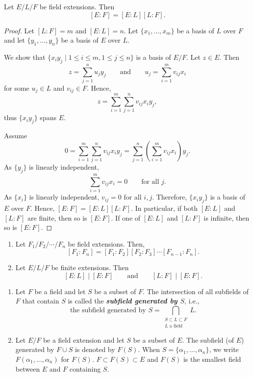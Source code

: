 \documentclass[twoside]{article}
\theoremstyle{remark}
\newcommand*\term[1]{\textbf{\textit{\mathversion{bold}#1}}}
\begin{document}
\begin{proposition}
  Let \(E/L/F\) be field extensions. Then
  \[ [E:F] = [E:L][L:F]. \]
\end{proposition}

\begin{proof}
  Let \([L:F] = m\) and \([E:L] = n\). Let \(\{x_1, \dots, x_m\}\) be a basis of \(L\) over \(F\) and let \(\{y_1, \dots, y_n\}\) be a basis of \(E\) over \(L\).
  
  We show that \(\{x_i y_j \mid 1 \leq i \leq m, 1 \leq j \leq n\}\) is a basis of \(E/F\). Let \(z \in E\). Then
  \[ z = \sum_{j=1}^n u_j y_j \qquad \text{and} \qquad u_j = \sum_{i=1}^m v_{ij} x_i \]
  for some \(u_j \in L\) and \(v_{ij} \in F\). Hence,
  \[ z = \sum_{i=1}^m \sum_{j=1}^n v_{ij} x_i y_j, \]
  thus \(\{x_i y_j\}\) spans \(E\).
  
  Assume
  \[ 0 = \sum_{i=1}^m \sum_{j=1}^n v_{ij} x_i y_j = \sum_{j=1}^n \left( \sum_{i=1}^m v_{ij} x_i \right) y_j. \]
  As \(\{y_j\}\) is linearly independent,
  \[ \sum_{i=1}^m v_{ij} x_i = 0 \qquad \text{for all } j. \]
  As \(\{x_i\}\) is linearly independent, \(v_{ij} = 0\) for all \(i,j\). Therefore, \(\{x_iy_j\}\) is a basis of \(E\) over \(F\). Hence, \([E:F] = [E:L] [L:F]\). In particular, if both \([E:L]\) and \([L:F]\) are finite, then so is \([E:F]\). If one of \([E:L]\) and \([L:F]\) is infinite, then so is \([E:F]\).
\end{proof}

\begin{corollary}
  \begin{enumerate}[label=\textup{(\arabic*)}, nosep]
    \item Let \(F_1/F_2/\cdots/F_n\) be field extensions. Then,
    \[ [F_1:F_n] = [F_1:F_2] [F_2:F_3] \cdots [F_{n-1}:F_n]. \]
    \item Let \(E/L/F\) be finite extensions. Then
    \[ [E:L] \mid [E:F] \qquad \text{and} \qquad [L:F] \mid [E:F]. \]
  \end{enumerate}
\end{corollary}

\begin{definition}
  \begin{enumerate}[label=\arabic*., nosep]
    \item Let \(F\) be a field and let \(S\) be a subset of \(F\). The intersection of all subfields of \(F\) that contain \(S\) is called the \term{subfield generated by \(S\)}, i.e., 
    \[ \text{the subfield generated by \(S\)} = \bigcap_{\substack{S \subset L \subset F\\\text{\(L\) a field}}} L. \]
    \item Let \(E/F\) be a field extension and let \(S\) be a subset of \(E\). The subfield (of \(E\)) generated by \(F \cup S\) is denoted by \(F(S)\). When \(S = \{\alpha_1, \dots, \alpha_n\}\), we write \(F(\alpha_1, \dots, \alpha_n)\) for \(F(S)\). \(F \subset F(S) \subset E\) and \(F(S)\) is the smallest field between \(E\) and \(F\) containing \(S\).
  \end{enumerate}
\end{definition}
\end{document}
